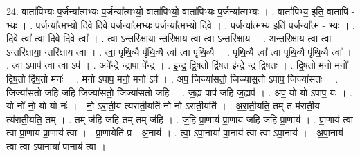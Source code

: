 \documentclass[17pt]{extarticle}
\begin{document}
24. वाता॑पिभ्यः प॒र्जन्या᳚त्मभ्यः प॒र्जन्या᳚त्मभ्यो॒ वाता॑पिभ्यो॒ वाता॑पिभ्यः प॒र्जन्या᳚त्मभ्यः । . वाता॑पिभ्य॒ इति॒ वाता॑पि - भ्यः॒ । . प॒र्जन्या᳚त्मभ्यो दि॒वे दि॒वे प॒र्जन्या᳚त्मभ्यः प॒र्जन्या᳚त्मभ्यो दि॒वे । . प॒र्जन्या᳚त्मभ्य॒ इति॑ प॒र्जन्या᳚त्म - भ्यः॒ । . दि॒वे त्वा᳚ त्वा दि॒वे दि॒वे त्वा᳚ । . त्वा॒ ऽन्तरि॑क्षाया॒ न्तरि॑क्षाय त्वा त्वा॒ ऽन्तरि॑क्षाय । . अ॒न्तरि॑क्षाय त्वा त्वा॒ ऽन्तरि॑क्षाया॒ न्तरि॑क्षाय त्वा । . त्वा॒ पृ॒थि॒व्यै पृ॑थि॒व्यै त्वा᳚ त्वा पृथि॒व्यै । . पृ॒थि॒व्यै त्वा᳚ त्वा पृथि॒व्यै पृ॑थि॒व्यै त्वा᳚ । . त्वा ऽपाप॑ त्वा॒ त्वा ऽप॑ । . अपे᳚न्द्रे॒ न्द्रापा पे᳚न्द्र । . इ॒न्द्र॒ द्वि॒ष॒तो द्वि॑ष॒त इ॑न्द्रे न्द्र द्विष॒तः । . द्वि॒ष॒तो मनो॒ मनो᳚ द्विष॒तो द्वि॑ष॒तो मनः॑ । . मनो ऽपाप॒ मनो॒ मनो ऽप॑ । . अप॒ जिज्या॑सतो॒ जिज्या॑स॒तो ऽपाप॒ जिज्या॑सतः । . जिज्या॑सतो जहि जहि॒ जिज्या॑सतो॒ जिज्या॑सतो जहि । . ज॒ह्य पाप॑ जहि ज॒ह्यप॑ । . अप॒ यो यो ऽपाप॒ यः । . यो नो॑ नो॒ यो यो नः॑ । . नो॒ ऽरा॒ती॒य त्य॑राती॒यति॑ नो नो ऽराती॒यति॑ । . अ॒रा॒ती॒यति॒ तम् त म॑राती॒य त्य॑राती॒यति॒ तम् । . तम् ज॑हि जहि॒ तम् तम् ज॑हि । . ज॒हि॒ प्रा॒णाय॑ प्रा॒णाय॑ जहि जहि प्रा॒णाय॑ । . प्रा॒णाय॑ त्वा त्वा प्रा॒णाय॑ प्रा॒णाय॑ त्वा । . प्रा॒णायेति॑ प्र - अ॒नाय॑ । . त्वा॒ ऽपा॒नाया॑ पा॒नाय॑ त्वा त्वा ऽपा॒नाय॑ । . अ॒पा॒नाय॑ त्वा त्वा ऽपा॒नाया॑ पा॒नाय॑ त्वा । \newline
\end{document}
